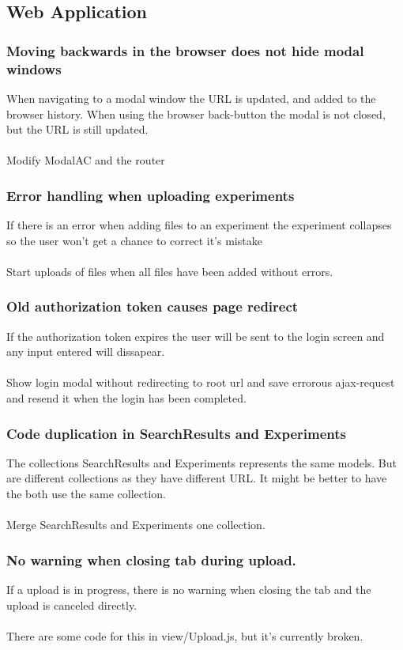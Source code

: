\subsection{Web Application}
\subsubsection{Moving backwards in the browser does not hide modal windows}
When navigating to a modal window the URL is updated, and added to the browser history. When using the browser back-button the modal is not closed, but the URL is still updated. \\
\\
 Modify ModalAC and the router
\subsubsection{Error handling when uploading experiments}
If there is an error when adding files to an experiment the experiment collapses so the user won't get a chance to correct it's mistake \\
\\
Start uploads of files when all files have been added without errors. 
\subsubsection{Old authorization token causes page redirect}
If the authorization token expires the user will be sent to the login screen and any input entered will dissapear. \\
\\
Show login modal without redirecting to root url and save errorous ajax-request and resend it when the login has been completed.
\subsubsection{Code duplication in SearchResults and Experiments}
The collections SearchResults and Experiments represents the same models. But are different collections as they have different URL. It might be better to have the both use the same collection. \\
\\
Merge SearchResults and Experiments one collection.
\subsubsection{No warning when closing tab during upload.}
If a upload is in progress, there is no warning when closing the tab and the upload is canceled directly. \\
\\
There are some code for this in view/Upload.js, but it's currently broken.
